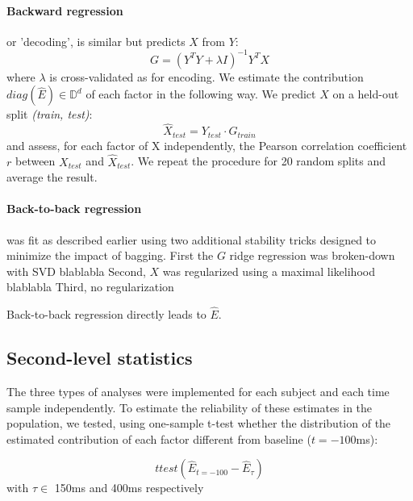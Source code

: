 \paragraph{Backward regression} or 'decoding', is similar but predicts $X$ from $Y$:
\begin{equation} G = (Y^{T}Y+\lambda I)^{-1} Y^{T}X \end{equation}
where $\lambda$ is cross-validated as for encoding. We estimate the
contribution $diag(\hat E) \in\mathbb{D}^{d} $ of each factor in the following
way. We predict $X$ on a held-out split \textit{(train, test)}:
\begin{equation} \hat X_{test} = Y_{test}\cdot G_{train} \end{equation}
and assess, for each factor of X independently, the Pearson correlation
coefficient $r$ between $X_{test}$ and $\hat X_{test}$. We repeat the procedure
for 20 random splits and average the result.

\paragraph{Back-to-back regression} was fit as described earlier using two
additional stability tricks designed to minimize the impact of bagging.  First
the $G$ ridge regression was broken-down with SVD blablabla Second, $X$ was
regularized using a maximal likelihood blablabla Third, no regularization

Back-to-back regression directly leads to $\hat E$.



\subsection{Second-level statistics}

The three types of analyses were implemented for each subject and each time
sample independently.  To estimate the reliability of these estimates in the
population, we tested, using one-sample t-test whether the distribution of the
estimated contribution of each factor different from baseline ($t=-100$ms):

\begin{equation} ttest(\hat E_{t=-100} - \hat E_{\tau}) \end{equation} with
$\tau \in $ 150ms and 400ms respectively


